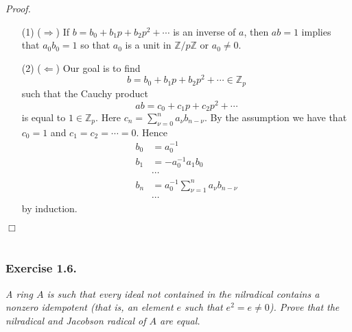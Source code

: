 \documentclass{article}
\begin{document}
\emph{Proof.}
\begin{enumerate}
\item[(1)]
  ($\Longrightarrow$)
  If $b = b_0 + b_1 p + b_2 p^2 + \cdots$ is an inverse of $a$,
  then $ab = 1$ implies that $a_0 b_0 = 1$ so that $a_0$ is a unit in $\mathbb{Z}/p\mathbb{Z}$
  or $a_0 \neq 0$.

\item[(2)]
  ($\Longleftarrow$)
  Our goal is to find
  \[
    b = b_0 + b_1 p + b_2 p^2 + \cdots \in \mathbb{Z}_p
  \]
  such that the Cauchy product
  \[
    ab = c_0 + c_1 p + c_2 p^2 + \cdots
  \]
  is equal to $1 \in \mathbb{Z}_p$.
  Here $c_n = \sum_{\nu = 0}^{n} a_{\nu} b_{n-\nu}$.
  By the assumption we have that $c_0 = 1$ and $c_1 = c_2 = \cdots = 0$.
  Hence
  \begin{align*}
    b_0 &= a_0^{-1} \\
    b_1 &= -a_0^{-1} a_1 b_0 \\
    & \cdots \\
    b_n &= a_0^{-1} \sum_{\nu = 1}^{n} a_\nu b_{n-\nu} \\
    & \cdots
  \end{align*}
  by induction.
\end{enumerate}
$\Box$ \\\\






\subsubsection*{Exercise 1.6.}
\emph{A ring $A$ is such that every ideal not contained in the nilradical
contains a nonzero idempotent (that is, an element $e$ such that $e^2 = e \neq 0$).
Prove that the nilradical and Jacobson radical of $A$ are equal.} \\
\end{document}
